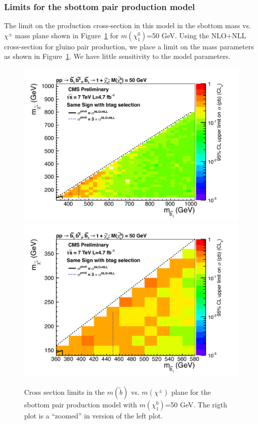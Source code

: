 \subsubsection{Limits for the sbottom pair production model}
\label{sec:sbottompairlimits}
The limit on the production cross-section in this model in the 
sbottom mass vs. $\chi^{\pm}$ mass plane shown in 
Figure~\ref{fig:sbottomLimit} for 
$m(\chi^0_1)$=50 GeV. 
Using the 
NLO$+$NLL cross-section for gluino pair production, we place a limit
on the mass parameters as shown in Figure~\ref{fig:sbottomLimit}.
We have little sensitivity to the model parameters.

\begin{figure}[htb]
\begin{center}
\includegraphics[width=0.48\linewidth]{figs/sbottom_limit.pdf}
\includegraphics[width=0.48\linewidth]{figs/sbottom_limit_zoom.pdf}
\caption{Cross section limits in the $m(\widetilde{b})$ vs. $m(\chi^{\pm})$ 
plane for the sbottom pair production model with 
$m(\chi^0_1)$=50 GeV.  The rigth plot is a ``zoomed'' in version 
of the left plot.\label{fig:sbottomLimit}}
\end{center}
\end{figure}






